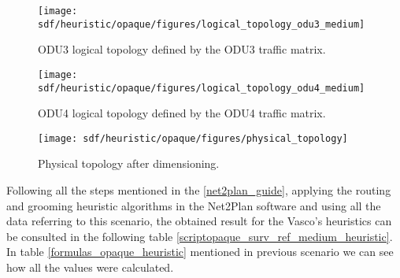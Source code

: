 \begin{figure}[H]
\centering
\texttt{[image: sdf/heuristic/opaque/figures/logical\_topology\_odu3\_medium]}
\caption{ODU3 logical topology defined by the ODU3 traffic matrix.}
\label{logical_ODU3_surv_ref_medium_heuristic}
\end{figure}

\begin{figure}[H]
\centering
\texttt{[image: sdf/heuristic/opaque/figures/logical\_topology\_odu4\_medium]}
\caption{ODU4 logical topology defined by the ODU4 traffic matrix.}
\label{logical_ODU4_surv_ref_medium_heuristic}
\end{figure}

\begin{figure}[H]
\centering
\texttt{[image: sdf/heuristic/opaque/figures/physical\_topology]}
\caption{Physical topology after dimensioning.}
\label{physical_topology_surv_ref_medium_heuristic}
\end{figure}

Following all the steps mentioned in the \ref{net2plan_guide}, applying the routing and grooming heuristic algorithms in the Net2Plan software and using all the data referring to this scenario, the obtained result for the Vasco's heuristics can be consulted in the following table \ref{scriptopaque_surv_ref_medium_heuristic}. In table \ref{formulas_opaque_heuristic} mentioned in previous scenario we can see how all the values were calculated.\\


